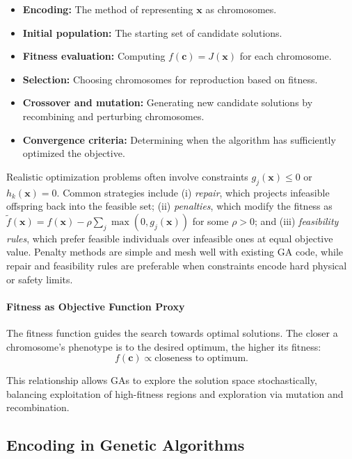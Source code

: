 \begin{itemize}
    \item \textbf{Encoding:} The method of representing \( \mathbf{x} \) as chromosomes.
    \item \textbf{Initial population:} The starting set of candidate solutions.
    \item \textbf{Fitness evaluation:} Computing \( f(\mathbf{c}) = J(\mathbf{x}) \) for each chromosome.
    \item \textbf{Selection:} Choosing chromosomes for reproduction based on fitness.
    \item \textbf{Crossover and mutation:} Generating new candidate solutions by recombining and perturbing chromosomes.
    \item \textbf{Convergence criteria:} Determining when the algorithm has sufficiently optimized the objective.
\end{itemize}

\begin{tcolorbox}[summarybox, title={Constraint handling in GAs}]
Realistic optimization problems often involve constraints \(g_j(\mathbf{x})\le 0\) or \(h_k(\mathbf{x})=0\). Common strategies include (i) \emph{repair}, which projects infeasible offspring back into the feasible set; (ii) \emph{penalties}, which modify the fitness as \(\tilde{f}(\mathbf{x}) = f(\mathbf{x}) - \rho \sum_j \max(0, g_j(\mathbf{x}))\) for some \(\rho>0\); and (iii) \emph{feasibility rules}, which prefer feasible individuals over infeasible ones at equal objective value. Penalty methods are simple and mesh well with existing GA code, while repair and feasibility rules are preferable when constraints encode hard physical or safety limits.
\end{tcolorbox}

\paragraph{Fitness as Objective Function Proxy}

The fitness function guides the search towards optimal solutions. The closer a chromosome's phenotype is to the desired optimum, the higher its fitness:
\[
f(\mathbf{c}) \propto \text{closeness to optimum}.
\]

This relationship allows GAs to explore the solution space stochastically, balancing exploitation of high-fitness regions and exploration via mutation and recombination.

\subsection{Encoding in Genetic Algorithms}
\label{sec:evo_encoding_in_genetic_algorithms}

